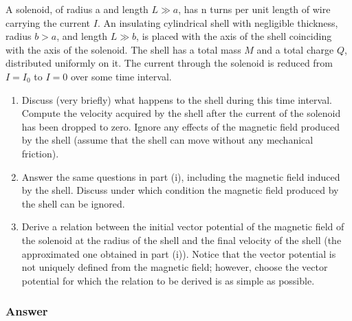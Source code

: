A solenoid, of radius a and length $L\gg a$, has n turns per unit length of wire carrying the current $I$. An insulating cylindrical shell with negligible thickness, radius $b > a$, and length $L \gg b$, is placed with the axis of the shell coinciding with the axis of the solenoid. The shell has a total mass $M$ and a total charge $Q$, distributed uniformly on it. The current through the solenoid is reduced from $I = I_0$ to $I = 0$ over some time interval.
\begin{enumerate}
	\item Discuss (very briefly) what happens to the shell during this time interval. Compute the velocity acquired by the shell after the current of the solenoid has been dropped to zero. Ignore any effects of the magnetic field produced by the shell (assume that the shell can move without any mechanical friction).
	\item Answer the same questions in part (i), including the magnetic field induced by the shell. Discuss under which condition the magnetic field produced by the shell can be ignored.
	\item Derive a relation between the initial vector potential of the magnetic field of the solenoid at the radius of the shell and the final velocity of the shell (the approximated one obtained in part (i)). Notice that the vector potential is not uniquely defined from the magnetic field; however, choose the vector potential for which the relation to be derived is as simple as possible.
\end{enumerate}

\subsubsection{Answer}

